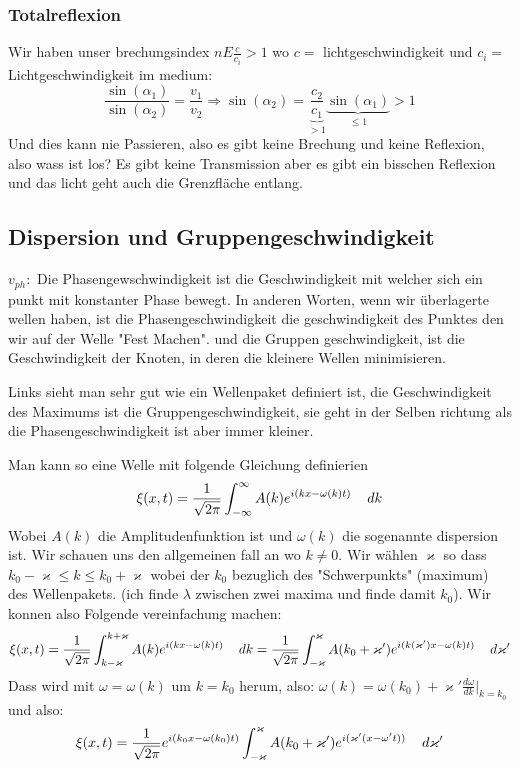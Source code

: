 \documentclass{article}
\newcommand{\mspc}{\hspace{0.4cm}}
\begin{document}
\subsubsection{Totalreflexion} Wir haben unser brechungsindex $nE\frac{c}{c_i}>1$ wo $c=$ lichtgeschwindigkeit und $c_i=$ Lichtgeschwindigkeit im medium:\[\frac{\sin(\alpha_1)}{\sin(\alpha_2)}=\frac{v_1}{v_2}\Rightarrow \sin(\alpha_2)=\underset{>1}{\underbrace{\frac{c_2}{c_1}}}\underset{\le 1}{\underbrace{\sin(\alpha_1)}}>1 \]
Und dies kann nie Passieren, also es gibt keine Brechung und keine Reflexion, also wass ist los? Es gibt keine Transmission aber es gibt ein bisschen Reflexion und das licht geht auch die Grenzfläche entlang.\newline
\subsection{Dispersion und Gruppengeschwindigkeit} $v_{ph}:$ Die Phasengewschwindigkeit ist die Geschwindigkeit mit welcher sich ein punkt mit konstanter Phase bewegt. In anderen Worten, wenn wir überlagerte wellen haben, ist die Phasengeschwindigkeit die geschwindigkeit des Punktes den wir auf der Welle "Fest Machen". und die Gruppen geschwindigkeit, ist die Geschwindigkeit der Knoten, in deren die kleinere Wellen minimisieren.
\begin{multicols}{2}
  Links sieht man sehr gut wie ein Wellenpaket definiert ist, die Geschwindigkeit des Maximums ist die Gruppengeschwindigkeit, sie geht in der Selben richtung als die Phasengeschwindigkeit ist aber immer kleiner.
\end{multicols}
Man kann so eine Welle mit folgende Gleichung definierien
\[\xi(x,t)=\frac{1}{\sqrt{2\pi}}\int_{-\infty}^{\infty}A(k)e^{i(kx-\omega(k) t)}\mspc dk\]
Wobei $A(k)$ die Amplitudenfunktion ist und $\omega(k)$ die sogenannte dispersion ist.\newline
Wir schauen uns den allgemeinen fall an wo $k\neq0$. Wir wählen $\varkappa$ so dass $k_0-\varkappa \le k\le k_0+\varkappa$ wobei der $k_0$ bezuglich des "Schwerpunkts" (maximum) des Wellenpakets. (ich finde $\lambda$ zwischen zwei maxima und finde damit $k_0$).
Wir konnen also Folgende vereinfachung machen:\[\xi(x,t)=\frac{1}{\sqrt{2\pi}}\int_{k-\varkappa}^{k+\varkappa}A(k) e^{i(kx-\omega(k)t)}\mspc dk=\frac{1}{\sqrt{2\pi}}\int_{-\varkappa}^{\varkappa}A(k_0+\varkappa') e^{i(k(\varkappa')x-\omega(k)t)}\mspc d\varkappa'\]
Dass wird mit $\omega=\omega(k)$ um $k=k_0$ herum, also: $\omega(k)=\omega(k_0)+\varkappa' \frac{d\omega}{dk}\left.\right|_{k=k_0}$ und also:\[\xi(x,t)=\frac{1}{\sqrt{2\pi}}e^{i(k_0x-\omega(k_0)t)}\int_{-\varkappa}^{\varkappa} A(k_0+\varkappa')e^{i(\varkappa'(x-\omega't))}\mspc d\varkappa'\]
\end{document}
